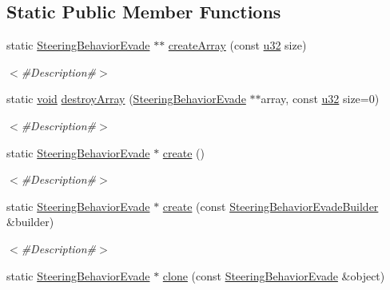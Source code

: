 \subsection*{Static Public Member Functions}
\begin{DoxyCompactItemize}
\item 
static \mbox{\hyperlink{classnjli_1_1_steering_behavior_evade}{Steering\+Behavior\+Evade}} $\ast$$\ast$ \mbox{\hyperlink{classnjli_1_1_steering_behavior_evade_a522887462e45b7e35476b2974a2c8373}{create\+Array}} (const \mbox{\hyperlink{_util_8h_a10e94b422ef0c20dcdec20d31a1f5049}{u32}} size)
\begin{DoxyCompactList}\small\item\em $<$\#\+Description\#$>$ \end{DoxyCompactList}\item 
static \mbox{\hyperlink{_thread_8h_af1e856da2e658414cb2456cb6f7ebc66}{void}} \mbox{\hyperlink{classnjli_1_1_steering_behavior_evade_af4226a065b9afeda6de43e7642b953bb}{destroy\+Array}} (\mbox{\hyperlink{classnjli_1_1_steering_behavior_evade}{Steering\+Behavior\+Evade}} $\ast$$\ast$array, const \mbox{\hyperlink{_util_8h_a10e94b422ef0c20dcdec20d31a1f5049}{u32}} size=0)
\begin{DoxyCompactList}\small\item\em $<$\#\+Description\#$>$ \end{DoxyCompactList}\item 
static \mbox{\hyperlink{classnjli_1_1_steering_behavior_evade}{Steering\+Behavior\+Evade}} $\ast$ \mbox{\hyperlink{classnjli_1_1_steering_behavior_evade_ad247df2ce7f2aec0dd3a795b45bef690}{create}} ()
\begin{DoxyCompactList}\small\item\em $<$\#\+Description\#$>$ \end{DoxyCompactList}\item 
static \mbox{\hyperlink{classnjli_1_1_steering_behavior_evade}{Steering\+Behavior\+Evade}} $\ast$ \mbox{\hyperlink{classnjli_1_1_steering_behavior_evade_ab3fd0cd8031e94cea6fd3c24d8b8d036}{create}} (const \mbox{\hyperlink{classnjli_1_1_steering_behavior_evade_builder}{Steering\+Behavior\+Evade\+Builder}} \&builder)
\begin{DoxyCompactList}\small\item\em $<$\#\+Description\#$>$ \end{DoxyCompactList}\item 
static \mbox{\hyperlink{classnjli_1_1_steering_behavior_evade}{Steering\+Behavior\+Evade}} $\ast$ \mbox{\hyperlink{classnjli_1_1_steering_behavior_evade_ac1d3de65ea7d4d54de69587ca9bd46f5}{clone}} (const \mbox{\hyperlink{classnjli_1_1_steering_behavior_evade}{Steering\+Behavior\+Evade}} \&object)

\end{DoxyCompactItemize}
